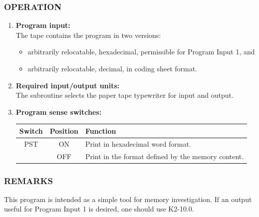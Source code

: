 \subsubsection*{OPERATION}
\begin{enumerate}
    \item \textbf{Program input:} \\
    The tape contains the program in two versions:
    \begin{itemize}
        \item[a)] arbitrarily relocatable, hexadecimal, permissible for Program Input 1, and
        \item[b)] arbitrarily relocatable, decimal, in coding sheet format.
    \end{itemize}
    \item \textbf{Required input/output units:} \\
    The subroutine selects the paper tape typewriter for input and output.
    \item \textbf{Program sense switches:}
    \begin{table}[h!]
    \centering
    \begin{tabular}{ccl}
    \toprule
    \textbf{Switch} & \textbf{Position} & \textbf{Function} \\
    \midrule
    \textsf{PST}             & \textsf{ON}                & Print in hexadecimal word format. \\
                    & \textsf{OFF}               & Print in the format defined by the memory content. \\
    \bottomrule
    \end{tabular}
    \end{table}
\end{enumerate}

\subsubsection*{REMARKS}
This program is intended as a simple tool for memory investigation. If an output useful for Program Input 1 is desired, one should use K2-10.0.
\newpage